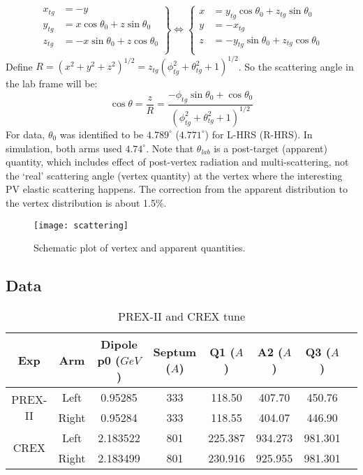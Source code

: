 \begin{equation}
    \left.
    \begin{aligned}
	x_{tg}	&= -y	\\
	y_{tg}	&= x\cos\theta_0 + z\sin\theta_0    \\
	z_{tg}	&= -x\sin\theta_0 + z\cos\theta_0   \\
    \end{aligned}
    \right\}
    \iff
    \left\{
    \begin{aligned}
	x   &= y_{tg}\cos\theta_0 + z_{tg}\sin\theta_0	\\
	y   &= -x_{tg}	\\
	z   &= -y_{tg}\sin\theta_0 + z_{tg}\cos\theta_0   \\
    \end{aligned}
    \right.
\end{equation}
Define $R = \left(x^2 + y^2 + z^2\right)^{1/2} = z_{tg} \left(\phi^2_{tg} + \theta^2_{tg} + 1\right)^{1/2}$.
So the scattering angle in the lab frame will be:
\begin{equation}
    \cos\theta = \frac{z}{R} = \frac{-\phi_{tg}\sin\theta_0 + \cos\theta_0}{\left(\phi^2_{tg} + \theta^2_{tg} + 1\right)^{1/2}}
\end{equation}
For data, $\theta_0$ was identified to be $4.789^\circ$ ($4.771^\circ$) for
L-HRS (R-HRS). In simulation, both arms used $4.74^\circ$. Note that $\theta_{lab}$
is a post-target (apparent) quantity, which includes effect of post-vertex radiation and
multi-scattering, not the `real' scattering angle (vertex quantity) at the vertex 
where the interesting PV elastic scattering happens. The correction from the apparent 
distribution to the vertex distribution is about 1.5\%.
\begin{figure}[H]
    \centering
    \texttt{[image: scattering]}
    \caption{Schematic plot of vertex and apparent quantities.}
\end{figure}

\subsection{Data}
\begin{table}[h!]
    \begin{tabular}{c c | c | c | c c c c}
	\hline
	Exp & Arm   & Dipole p0 ($GeV$)    & Septum ($A$)  & Q1 ($A$)	& A2 ($A$) & Q3 ($A$)  \\
	\hline
	\multirow{2}{*}{PREX-II} & Left	& 0.95285   & 333   & 118.50	& 407.70    & 450.76    \\
				 & Right& 0.95284   & 333   & 118.55	& 404.07    & 446.90    \\
	\hline
	\multirow{2}{*}{CREX}	& Left	& 2.183522  & 801   & 225.387	& 934.273   & 981.301    \\
				& Right	& 2.183499  & 801   & 230.916	& 925.955   & 981.301    \\
	\hline
    \end{tabular}
    \caption{PREX-II and CREX tune}
    \label{tab:pcrex_tune}
\end{table}

